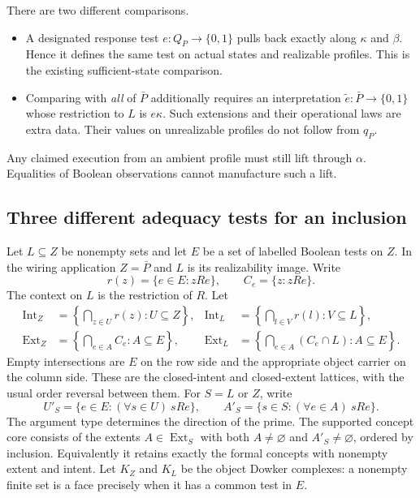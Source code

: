 \documentclass[11pt]{article}
\theoremstyle{definition}
\theoremstyle{remark}\newtheorem{remark}[theorem]{Remark}
\newcommand{\Ext}{\operatorname{Ext}}
\newcommand{\Int}{\operatorname{Int}}
\begin{document}
There are two different comparisons.
\begin{itemize}
\item A designated response test $e:Q_P\to\{0,1\}$ pulls back exactly
along $\kappa$ and $\beta$. Hence it defines the same test on actual
states and realizable profiles. This is the existing sufficient-state
comparison.
\item Comparing with \emph{all} of $\bar P$ additionally requires an
interpretation $\widetilde e:\bar P\to\{0,1\}$ whose restriction to
$L$ is $e\kappa$. Such extensions and their operational laws are extra
data. Their values on unrealizable profiles do not follow from $q_P$.
\end{itemize}
Any claimed execution from an ambient profile must still lift through
$\alpha$. Equalities of Boolean observations cannot manufacture such a
lift.

\subsection{Three different adequacy tests for an inclusion}
Let $L\subseteq Z$ be nonempty sets and let $E$ be a set of labelled
Boolean tests on $Z$. In the wiring application $Z=\bar P$ and $L$ is
its realizability image. Write
\[
 r(z)=\{e\in E:zRe\},\qquad C_e=\{z:zRe\}.
\]
The context on $L$ is the restriction of $R$. Let
\begin{align*}
 \Int_Z&=\left\{\bigcap_{z\in U}r(z):U\subseteq Z\right\},&
 \Int_L&=\left\{\bigcap_{l\in V}r(l):V\subseteq L\right\},\\
 \Ext_Z&=\left\{\bigcap_{e\in A}C_e:A\subseteq E\right\},&
 \Ext_L&=\left\{\bigcap_{e\in A}(C_e\cap L):A\subseteq E\right\}.
\end{align*}
Empty intersections are $E$ on the row side and the appropriate object
carrier on the column side. These are the closed-intent and closed-extent
lattices, with the usual order reversal between them. For $S=L$ or $Z$,
write
\[
 U'_S=\{e\in E:(\forall s\in U)\ sRe\},\qquad
 A'_S=\{s\in S:(\forall e\in A)\ sRe\}.
\]
The argument type determines the direction of the prime. The supported
concept core consists of the extents $A\in\Ext_S$ with both $A\ne\varnothing$
and $A'_S\ne\varnothing$, ordered by inclusion. Equivalently it retains
exactly the formal concepts with nonempty extent and intent.
Let $K_Z$ and $K_L$
be the object Dowker complexes: a nonempty finite set is a face precisely
when it has a common test in $E$.
\end{document}
